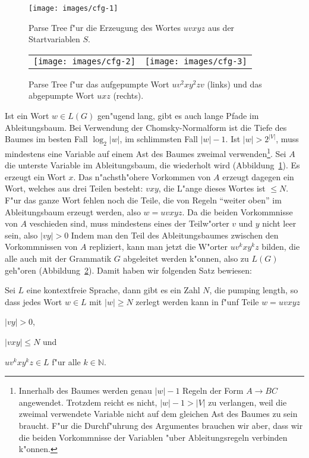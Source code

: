 \begin{figure}
\begin{center}
\texttt{[image: images/cfg-1]}
\end{center}
\caption{Parse Tree f"ur die Erzeugung des Wortes $uvxyz$ aus der
Startvariablen $S$.\label{cfg-tree-1}}
\end{figure}
\begin{figure}
\begin{center}
\begin{tabular}{cc}
\texttt{[image: images/cfg-2]}&%
\texttt{[image: images/cfg-3]}\\
\end{tabular}
\end{center}
\caption{Parse Tree f"ur das aufgepumpte Wort $uv^2xy^2zv$ (links) und das
abgepumpte Wort $uxz$ (rechts).\label{cfg-tree-2}}
\end{figure}

Ist ein Wort $w\in L(G)$ gen"ugend lang, gibt es auch lange Pfade im
Ableitungsbaum. Bei Verwendung der Chomsky-Normalform ist die 
Tiefe des Baumes im besten Fall $\log_2 |w|$, im schlimmsten Fall $|w|-1$.
Ist $|w|>2^{|V|}$, muss mindestens eine
Variable auf einem Ast des Baumes zweimal verwenden\footnote{
Innerhalb des Baumes werden genau $|w|-1$ Regeln der
Form $A\to BC$ angewendet.
Trotzdem reicht es nicht, $|w|-1>|V|$ zu verlangen, weil die
zweimal verwendete Variable nicht auf dem gleichen Ast des
Baumes zu sein braucht. F"ur die Durchf"uhrung des Argumentes
brauchen wir aber, dass wir die beiden Vorkommnisse der Variablen
"uber Ableitungsregeln verbinden k"onnen.}.
Sei $A$ die unterste Variable im Ableitungsbaum, die wiederholt
wird (Abbildung~\ref{cfg-tree-1}).
Es erzeugt ein Wort $x$. Das n"achsth"ohere Vorkommen von $A$
erzeugt dagegen ein Wort, welches aus drei Teilen besteht:
$vxy$, die L"ange dieses Wortes ist $\le N$. F"ur das ganze Wort fehlen
noch die Teile, die von Regeln ``weiter oben'' im Ableitungsbaum
erzeugt werden, also $w=uvxyz$.
Da die beiden Vorkommnisse von $A$ veschieden sind, muss mindestens
eines der Teilw"orter $v$ und $y$ nicht leer sein, also $|vy|>0$
Indem man den Teil des Ableitungsbaumes
zwischen den Vorkommnissen von $A$ repliziert, kann man jetzt die
W"orter $uv^kxy^kz$ bilden, die alle auch mit der Grammatik $G$ 
abgeleitet werden k"onnen, also zu $L(G)$ geh"oren (Abbildung~\ref{cfg-tree-2}).
Damit haben wir folgenden Satz bewiesen:

\begin{satz}
Sei $L$ eine kontextfreie Sprache, dann gibt es ein Zahl $N$, die pumping
length, so dass jedes Wort $w\in L$ mit $|w|\ge N$ zerlegt werden
kann in f"unf Teile $w=uvxyz$
\begin{compactenum}
\item
$|vy|>0$,
\item
$|vxy|\le N$ und
\item
$uv^kxy^kz\in L$ f"ur alle $k\in\mathbb N$.
\end{compactenum}
\end{satz}

